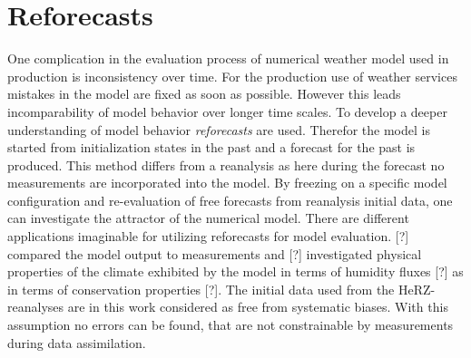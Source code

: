 \section{Reforecasts}
\p
One complication in the evaluation process of numerical weather model used in production is inconsistency over time. For the production use of weather services mistakes in the model are fixed as soon as possible. However this leads incomparability of model behavior over longer time scales.
\p
To develop a deeper understanding of model behavior \emph{reforecasts} are used. Therefor the model is started from initialization states in the past and a forecast for the past is produced. This method differs from a reanalysis as here during the forecast no measurements are incorporated into the model.
\p
By freezing on a specific model configuration and re-evaluation of free forecasts from reanalysis initial data, one can investigate the attractor of the numerical model.
\p
There are different applications imaginable for utilizing reforecasts for model evaluation. [?] compared the model output to measurements and [?] investigated physical properties of the climate exhibited by the model in terms of humidity fluxes [?] as in terms of conservation properties [?].
\p
The initial data used from the HeRZ-reanalyses are in this work considered as free from systematic biases. With this assumption no errors can be found, that are not constrainable by measurements during data assimilation. 

\pagebreak
